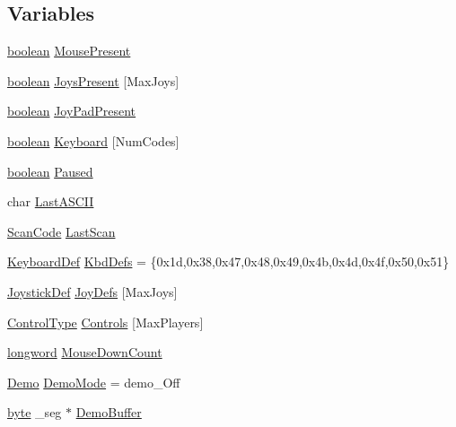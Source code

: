 \subsection*{Variables}
\begin{DoxyCompactItemize}
\item 
\hyperlink{ID__HEAD_8H_a7c6368b321bd9acd0149b030bb8275ed}{boolean} \hyperlink{ID__IN_8C_acfbb4437bdf4555f53ac0b13925b6d32}{MousePresent}
\item 
\hyperlink{ID__HEAD_8H_a7c6368b321bd9acd0149b030bb8275ed}{boolean} \hyperlink{ID__IN_8C_a954105121102803577bc52b8f0e733cd}{JoysPresent} \mbox{[}MaxJoys\mbox{]}
\item 
\hyperlink{ID__HEAD_8H_a7c6368b321bd9acd0149b030bb8275ed}{boolean} \hyperlink{ID__IN_8C_a2d43a4f05f8981ea5e2a4f087fe775c5}{JoyPadPresent}
\item 
\hyperlink{ID__HEAD_8H_a7c6368b321bd9acd0149b030bb8275ed}{boolean} \hyperlink{ID__IN_8C_af2090fe8236764c1093020b141ca4ddd}{Keyboard} \mbox{[}NumCodes\mbox{]}
\item 
\hyperlink{ID__HEAD_8H_a7c6368b321bd9acd0149b030bb8275ed}{boolean} \hyperlink{ID__IN_8C_a8bb9401d8f4d8323faee50f94a4be7b5}{Paused}
\item 
char \hyperlink{ID__IN_8C_ae0bac1d5b862fc73354b6992e25e9207}{LastASCII}
\item 
\hyperlink{ID__IN_8H_a92ee9291fc7e992c1662c4e195242f2d}{ScanCode} \hyperlink{ID__IN_8C_a294d54f35598c13b2caa8bee664743a4}{LastScan}
\item 
\hyperlink{structKeyboardDef}{KeyboardDef} \hyperlink{ID__IN_8C_a27c5715e087f17739848d747929a11ae}{KbdDefs} = \{0x1d,0x38,0x47,0x48,0x49,0x4b,0x4d,0x4f,0x50,0x51\}
\item 
\hyperlink{structJoystickDef}{JoystickDef} \hyperlink{ID__IN_8C_a9a0430b044ebc95c3a6fab27fd89531f}{JoyDefs} \mbox{[}MaxJoys\mbox{]}
\item 
\hyperlink{ID__IN_8H_a8005f1f182fd0248a710ca64f72508d4}{ControlType} \hyperlink{ID__IN_8C_a9cf23a083833e7437416b3a0fedae789}{Controls} \mbox{[}MaxPlayers\mbox{]}
\item 
\hyperlink{ID__HEAD_8H_a8a9a7dd50c6fdb45dcdf0eb929479663}{longword} \hyperlink{ID__IN_8C_a2623f228936e38b5463eeb42e057b634}{MouseDownCount}
\item 
\hyperlink{ID__IN_8H_aee6aa8565f29397f3cdc22bf15ba6763}{Demo} \hyperlink{ID__IN_8C_a3f08b9ae9c5b54f2990ec177babb74ef}{DemoMode} = demo\_\-Off
\item 
\hyperlink{ID__HEAD_8H_a0c8186d9b9b7880309c27230bbb5e69d}{byte} \_\-seg $\ast$ \hyperlink{ID__IN_8C_ab667a009823ca43974aa23e0ed2e2d33}{DemoBuffer}

\end{DoxyCompactItemize}
